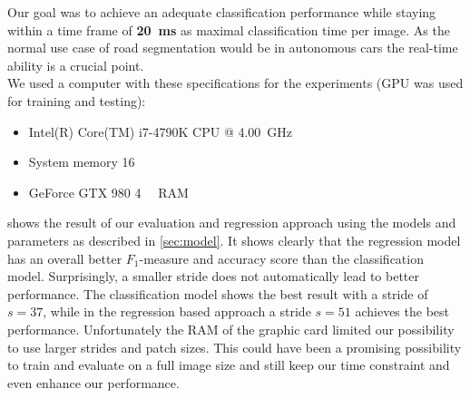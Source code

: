 Our goal was to achieve an adequate classification performance while staying
within a time frame of \textbf{\SI{20}{\milli\second}} as maximal
classification time per image. As the normal use case of road segmentation
would be in autonomous cars the real-time ability is a crucial point.\\

We used a computer with these specifications for the experiments (GPU was used
for training and testing):
\begin{itemize}
    \item Intel(R) Core(TM) i7-4790K CPU @ \SI{4.00}{\giga\hertz}
    \item System memory \SI{16}{\gibi\byte}
    \item GeForce GTX 980 \SI{4}{\gibi\byte} RAM
\end{itemize}

 shows the result of our evaluation and regression
approach using the models and parameters as described in \cref{sec:model}.
It shows clearly that the regression model has an
overall better $F_1$-measure and accuracy score than the classification model.
Surprisingly, a smaller stride does not automatically lead to better
performance. The classification model shows  the best result with a stride of $s=37$,
while in the regression based approach a stride $s=51$ achieves the
best performance. Unfortunately the RAM of the graphic card limited our
possibility to use larger strides and patch sizes. This could have been a
promising possibility to train and evaluate on a full image size and still keep
our time constraint and even enhance our performance.\\

